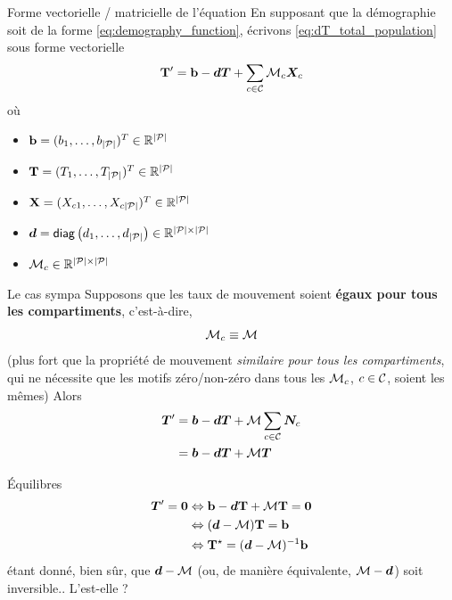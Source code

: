 \documentclass[aspectratio=169]{beamer}\usepackage[]{graphicx}\usepackage[]{xcolor}
\begin{document}
\begin{frame}{Forme vectorielle / matricielle de l'équation}
En supposant que la démographie soit de la forme \eqref{eq:demography_function}, écrivons \eqref{eq:dT_total_population} sous forme vectorielle
\begin{equation}\label{sys:dN_general} 
	\mathbf{T}'=\mathbf{b}-\bm{d}\bm{T}+\sum_{c\in\mathcal{C}}\mathcal{M}_c\bm{X}_{c}	
\end{equation}
où
\begin{itemize}
	\item $\mathbf{b}=(b_1,\ldots,b_{|\mathcal{P}|})^T\in\mathbb{R}^{|\mathcal{P}|}$
	\item $\mathbf{T}=(T_1,\ldots,T_{|\mathcal{P}|})^T\in\mathbb{R}^{|\mathcal{P}|}$
	\item $\mathbf{X}=(X_{c1},\ldots,X_{c{|\mathcal{P}|}})^T\in\mathbb{R}^{|\mathcal{P}|}$
	\item $\bm{d}=\mathsf{diag}\left(d_1,\ldots,d_{|\mathcal{P}|}\right)\in\mathbb{R}^{|\mathcal{P}|\times|\mathcal{P}|}$
	\item $\mathcal{M}_c\in\mathbb{R}^{|\mathcal{P}|\times|\mathcal{P}|}$
\end{itemize}

\end{frame}


\begin{frame}{Le cas sympa}
Supposons que les taux de mouvement soient \textbf{égaux pour tous les compartiments}, c'est-à-dire,
$$
\mathcal{M}_c\equiv\mathcal{M}
$$
\vfill
(plus fort que la propriété de mouvement \emph{similaire pour tous les compartiments}, qui ne nécessite que les motifs zéro/non-zéro dans tous les $\mathcal{M}_c$, $c\in\mathcal{C}$, soient les mêmes)
\vfill
Alors
\begin{align}
\bm{T}' &= \bm{b}-\bm{d}\bm{T}+\mathcal{M}\sum_{c\in\mathcal{C}}\bm{N}_{c} \nonumber \\
&= \bm{b}-\bm{d}\bm{T}+\mathcal{M}\bm{T} \label{sys:pSLIRS_toy_dN}
\end{align}
\end{frame}


\begin{frame}{Équilibres}
$$
\begin{aligned}
\bT'=\b0 &\Leftrightarrow \mathbf{b}-\bd\mathbf{T}+\mathcal{M}\mathbf{T}=\mathbf{0} \\
&\Leftrightarrow (\bd-\mathcal{M})\mathbf{T}=\mathbf{b} \\
&\Leftrightarrow \mathbf{T}^\star=(\bd-\mathcal{M})^{-1}\mathbf{b}
\end{aligned}
$$
étant donné, bien sûr, que $\bm{d}-\mathcal{M}$ (ou, de manière équivalente, $\mathcal{M}-\bm{d}$) soit inversible.. 
\vfill
L'est-elle ?
\end{frame}
\end{document}
